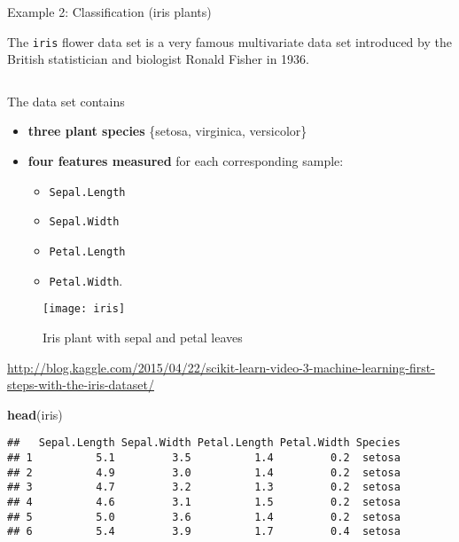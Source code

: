 \documentclass[10pt,ignorenonframetext,]{beamer}
\newenvironment{Shaded}{\begin{snugshade}}{\end{snugshade}}
\newcommand{\KeywordTok}[1]{\textcolor[rgb]{0.13,0.29,0.53}{\textbf{#1}}}
\newcommand{\NormalTok}[1]{#1}
\providecommand{\tightlist}{%
  \setlength{\itemsep}{0pt}\setlength{\parskip}{0pt}}
\begin{document}
\begin{frame}[fragile]{Example 2: Classification (iris plants)}
\protect\hypertarget{example-2-classification-iris-plants}{}

The \texttt{iris} flower data set is a very famous multivariate data set
introduced by the British statistician and biologist Ronald Fisher in
1936.

\(~\)

The data set contains

\begin{itemize}
\tightlist
\item
  \textbf{three plant species} \{setosa, virginica, versicolor\}
\item
  \textbf{four features measured} for each corresponding sample:

  \begin{itemize}
  \tightlist
  \item
    \texttt{Sepal.Length}
  \item
    \texttt{Sepal.Width}
  \item
    \texttt{Petal.Length}
  \item
    \texttt{Petal.Width}.
  \end{itemize}
\end{itemize}

\end{frame}

\begin{frame}

\begin{figure}
\texttt{[image: iris]} \caption{Iris plant with sepal and petal leaves}\label{fig:iris_pic}
\end{figure}

\tiny

\url{http://blog.kaggle.com/2015/04/22/scikit-learn-video-3-machine-learning-first-steps-with-the-iris-dataset/}

\end{frame}

\begin{frame}[fragile]

\scriptsize

\begin{Shaded}
\begin{Highlighting}[]
\KeywordTok{head}\NormalTok{(iris)}
\end{Highlighting}
\end{Shaded}

\begin{verbatim}
##   Sepal.Length Sepal.Width Petal.Length Petal.Width Species
## 1          5.1         3.5          1.4         0.2  setosa
## 2          4.9         3.0          1.4         0.2  setosa
## 3          4.7         3.2          1.3         0.2  setosa
## 4          4.6         3.1          1.5         0.2  setosa
## 5          5.0         3.6          1.4         0.2  setosa
## 6          5.4         3.9          1.7         0.4  setosa
\end{verbatim}

\normalsize

\end{frame}
\end{document}
